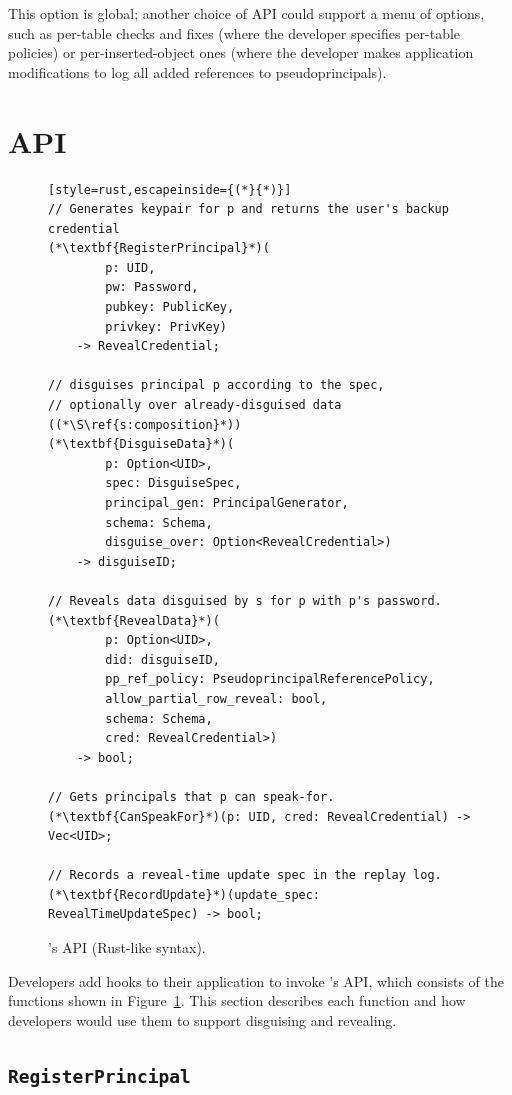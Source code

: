 This option is global; another choice of API could support a menu of
options, such as per-table checks and fixes (where the developer specifies
per-table policies) or per-inserted-object ones (where the developer makes
application modifications to log all added references to pseudoprincipals).
%
%
   

\section{API}
\label{s:api}


\begin{figure}[t]
\begin{lstlisting}[style=rust,escapeinside={(*}{*)}]
// Generates keypair for p and returns the user's backup credential
(*\textbf{RegisterPrincipal}*)(
        p: UID, 
        pw: Password,
        pubkey: PublicKey, 
        privkey: PrivKey)
    -> RevealCredential;

// disguises principal p according to the spec, 
// optionally over already-disguised data ((*\S\ref{s:composition}*))
(*\textbf{DisguiseData}*)(
        p: Option<UID>, 
        spec: DisguiseSpec,
        principal_gen: PrincipalGenerator,
        schema: Schema,
        disguise_over: Option<RevealCredential>) 
    -> disguiseID;

// Reveals data disguised by s for p with p's password. 
(*\textbf{RevealData}*)(
        p: Option<UID>, 
        did: disguiseID, 
        pp_ref_policy: PseudoprincipalReferencePolicy,
        allow_partial_row_reveal: bool,
        schema: Schema,
        cred: RevealCredential>)
    -> bool;

// Gets principals that p can speak-for.
(*\textbf{CanSpeakFor}*)(p: UID, cred: RevealCredential) -> Vec<UID>;

// Records a reveal-time update spec in the replay log.
(*\textbf{RecordUpdate}*)(update_spec: RevealTimeUpdateSpec) -> bool;
\end{lstlisting}
\caption{\sys's API (Rust-like syntax).}
\label{f:api-high}
\end{figure}
%

Developers add hooks to their application to invoke \sys's API, which consists
of the functions shown in Figure~\ref{f:api-high}. This section describes each
function and how developers would use them to support disguising and revealing.
 

\subsection{\texttt{RegisterPrincipal}}

